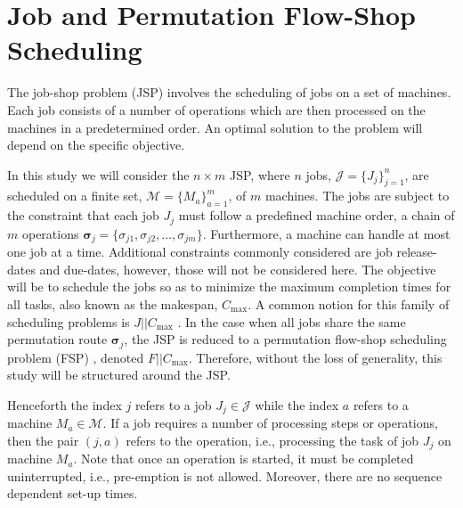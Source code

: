 \documentclass[smallextended]{svjour3}
\renewcommand{\vsigma}{\bm \sigma}
\begin{document}
		
\section{Job and Permutation Flow-Shop Scheduling}\label{sec:problemdef}
The job-shop problem (JSP) involves the scheduling of jobs on a set of 
machines. Each job consists of a number of operations which are then processed 
on the machines in a predetermined order. An optimal solution to the problem 
will depend on the specific objective. 

In this study we will consider the $n\times m$ JSP, where $n$ jobs, 
$\mathcal{J}=\{J_j\}_{j=1}^n$, are scheduled on a finite set, 
$\mathcal{M}=\{M_a\}_{a=1}^m$, of $m$ machines. The jobs are subject to the 
constraint that each job $J_j$ must follow a predefined machine order, a chain 
of $m$ operations  $\vsigma_j=\{\sigma_{j1},\sigma_{j2},\dotsc,\sigma_{jm}\}$. 
Furthermore, a machine can handle at most one job at a time. Additional 
constraints commonly considered are job release-dates and due-dates, however, 
those will not be considered here.  The objective will be to schedule the jobs 
so as to minimize the maximum completion times for all tasks, also known as the 
makespan, $C_{\max}$. A common notion for this family of scheduling problems is 
$J||C_{\max}$ \citep{Pinedo08}.  In the case when all jobs share the same 
permutation route $\vsigma_j$, the JSP is reduced to a permutation flow-shop 
scheduling problem (FSP) \citep{Guinet1998,Tay08}, denoted $F||C_{\max}$. 
Therefore, without the loss of generality, this study will be structured around 
the JSP.

Henceforth the index $j$ refers to a job $J_j\in\mathcal{J}$ while the index 
$a$ refers to a machine $M_a\in\mathcal{M}$. If a job requires a number of 
processing steps or operations, then the pair $(j,a)$ refers to the operation, 
i.e., processing the task of job $J_j$ on machine $M_a$. Note that once an 
operation is started, it must be completed uninterrupted, i.e., pre-emption is 
not allowed. Moreover, there are no sequence dependent set-up times.
\end{document}
